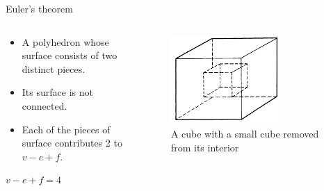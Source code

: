 \documentclass{beamer}
\begin{document}
\begin{frame}{Euler's theorem}
\begin{columns}
\begin{column}{0.5\textwidth}
  \begin{block}{}
    \begin{itemize}
    \item A polyhedron whose surface consists of two distinct pieces.
    \item Its surface is not connected.
    \item Each of the pieces of surface contributes 2 to $v - e + f$.
    \end{itemize}
  \end{block}
  \begin{block}{}
    $v - e + f = 4$
  \end{block}
\end{column}
\begin{column}{0.5\textwidth}
    \begin{figure}
    \centering
        \includegraphics[width=0.7\textwidth]{figure_1_2.png}
        \caption{A cube with a small cube removed from its interior}
    \end{figure}
\end{column}
\end{columns}
\end{frame}
\end{document}
